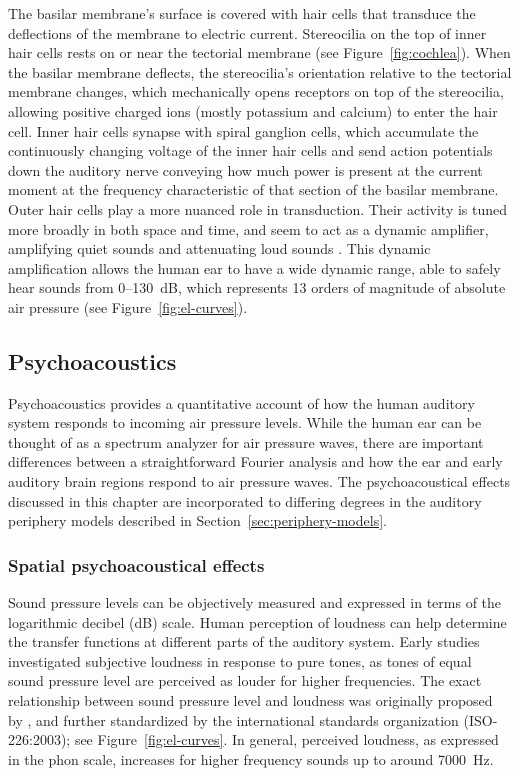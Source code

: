 The basilar membrane's surface is covered
with hair cells that transduce
the deflections of the membrane
to electric current.
Stereocilia on the top of inner hair cells
rests on or near the tectorial membrane
(see Figure~\ref{fig:cochlea}).
When the basilar membrane deflects,
the stereocilia's orientation
relative to the tectorial membrane changes,
which mechanically opens receptors
on top of the stereocilia,
allowing positive charged ions
(mostly potassium and calcium)
to enter the hair cell.
Inner hair cells synapse with
spiral ganglion cells,
which accumulate the continuously
changing voltage of the inner hair cells
and send action potentials
down the auditory nerve
conveying how much power
is present at the current moment
at the frequency characteristic
of that section of the basilar membrane.
Outer hair cells play a more nuanced
role in transduction.
Their activity is tuned
more broadly in both space and time,
and seem to act as a dynamic amplifier,
amplifying quiet sounds and
attenuating loud sounds
\citep{dallos1992}.
This dynamic amplification allows
the human ear to have a wide dynamic range,
able to safely hear sounds from 0--130~dB,
which represents 13 orders of magnitude
of absolute air pressure
(see Figure~\ref{fig:el-curves}).

\subsection{Psychoacoustics}
\label{sec:psychoacoustics}

Psychoacoustics provides a quantitative account
of how the human auditory system
responds to incoming air pressure levels.
While the human ear can be thought of
as a spectrum analyzer for air pressure waves,
there are important differences between
a straightforward Fourier analysis
and how the ear and early auditory brain regions
respond to air pressure waves.
The psychoacoustical effects
discussed in this chapter
are incorporated to differing degrees
in the auditory periphery models described
in Section~\ref{sec:periphery-models}.

\subsubsection{Spatial psychoacoustical effects}

Sound pressure levels can be objectively measured
and expressed in terms of the logarithmic
decibel (dB) scale.
Human perception of loudness can help
determine the transfer functions
at different parts of the auditory system.
Early studies investigated
subjective loudness in response
to pure tones,
as tones of equal sound pressure level
are perceived as louder for higher frequencies.
The exact relationship between
sound pressure level and
loudness was originally proposed
by \citet{fletcher1933},
and further standardized
by the international standards organization
(ISO-226:2003);
see Figure~\ref{fig:el-curves}.
In general, perceived loudness,
as expressed in the phon scale,
increases for higher frequency sounds
up to around 7000~Hz.

